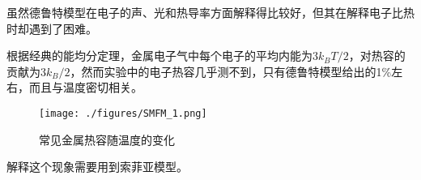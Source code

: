 
虽然德鲁特模型在电子的声、光和热导率方面解释得比较好，但其在解释电子比热时却遇到了困难。

根据经典的能均分定理，金属电子气中每个电子的平均内能为$3k_BT/2$，对热容的贡献为$3k_B/2$，然而实验中的电子热容几乎测不到，只有德鲁特模型给出的1\%左右，而且与温度密切相关。
\begin{figure}[ht]
\centering
\texttt{[image: ./figures/SMFM\_1.png]}
\caption{常见金属热容随温度的变化} \label{SMFM_fig1}
\end{figure}
解释这个现象需要用到索菲亚模型。